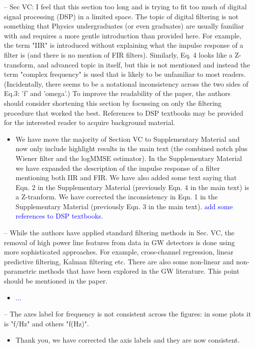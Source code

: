 \documentclass{article}
\newcommand{\todo}{\textcolor{blue}}
\begin{document}
\noindent
-- Sec VC: I feel that this section too long and is trying to fit too much of digital signal processing (DSP) in a limited space. The topic of digital filtering is not something that Physics undergraduates (or even graduates) are usually familiar with and requires a more gentle introduction than provided here. For example, the term "IIR" is introduced without explaining what the impulse response of a filter is (and there is no mention of FIR filters). Similarly, Eq. 4 looks like a Z-transform, and advanced topic in itself, but this is not mentioned and instead the term "complex frequency" is used that is likely to be unfamiliar to most readers. (Incidentally, there seems to be a notational inconsistency across the two sides of Eq.3: 'f' and 'omega'.) To improve the readability of the paper, the authors should consider shortening this section by focussing on only the filtering procedure that worked the best. References to DSP textbooks may be provided for the interested reader to acquire background material. 
\begin{itemize}
\item We have move the majority of Section VC to Supplementary Material and now only include highlight results in the main text (the combined notch plus Wiener filter and the logMMSE estimator). In the Supplementary Material we have expanded the description of the impulse response of a filter mentioning both IIR and FIR. We have also added some text saying that Eqn. 2 in the Supplementary Material (previously Eqn. 4 in the main text) is a Z-tranform. We have corrected the inconsistency in Eqn. 1 in the Supplementary Material (previously Eqn. 3 in the main text). 
\todo{add some references to DSP textbooks.}
\end{itemize}

\noindent
-- While the authors have applied standard filtering methods in Sec. VC, the removal of high power line features from data in GW detectors is done using more sophisticated approaches. For example, cross-channel regression, linear predictive filtering, Kalman filtering etc. There are also some non-linear and non-parametric methods that have been explored in the GW literature. This point should be mentioned in the paper.
\begin{itemize}
\item \todo{...}
\end{itemize}

\noindent
-- The axes label for frequency is not consistent across the figures: in some plots it is "f/Hz" and others "f(Hz)".
\begin{itemize}
\item Thank you, we have corrected the axis labels and they are now consistent.
\end{itemize}
\end{document}

